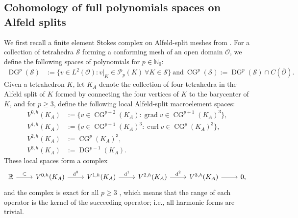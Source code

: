 \documentclass{mcom-l}
\theoremstyle{definition}
\theoremstyle{remark}
\numberwithin{equation}{section}
\DeclareMathOperator{\CG}{CG}
\DeclareMathOperator{\DG}{DG}
\DeclareMathOperator{\curl}{curl}
\DeclareMathOperator{\grad}{grad}
\DeclareMathOperator{\dee}{d}
\begin{document}
\subsection{Cohomology of full polynomials spaces on Alfeld splits}

We first recall a finite element Stokes complex on Alfeld-split meshes
from \cite{FuGuzmanNeilan20}.
For a collection of tetrahedra $\mathcal{S}$ forming a conforming mesh 
of an open domain $\mathcal{O}$, we define the following spaces of polynomials 
for $p \in \mathbb{N}_0$:
\begin{align*}
	\DG^p(\mathcal{S}) &:= \{ v \in L^2(\mathcal{O}) : 
	v|_{K} \in \mathcal{P}_p(K) \ \forall K \in \mathcal{S} \}
	\ \text{and} \   
	\CG^p(\mathcal{S}) := \DG^p(\mathcal{S}) \cap C(\bar{\mathcal{O}}).
\end{align*}
Given a tetrahedron $K$, let $K_A$ denote 
the collection of four tetrahedra in the Alfeld split of $K$ formed by 
connecting the four vertices of $K$ to the barycenter of $K$,
and for $p \geq 3$, define the following local Alfeld-split macroelement spaces:
\begin{subequations}
	\label{eq:local-full-alfeld}
	\begin{alignat}{2}
		V^{0, h}(K_A) &:= \{v \in \CG^{p+2}(K_A) 
		: \grad v \in \CG^{p+1}(K_A)^3\},\\
		V^{1, h}(K_A) &:= \{v \in \CG^{p+1}(K_A)^3 
		: \curl v \in \CG^{p}(K_A)^3\},\\
		V^{2, h}(K_A) &:= \CG^p(K_A)^3, \\
		V^{3, h}(K_A) &:= \DG^{p-1}(K_A).
	\end{alignat}	
\end{subequations}
These local spaces form a complex 
\begin{equation}
	\label{eq:stokes-complex-local-full-alfeld}
	\begin{tikzcd}
		\mathbb{R} \arrow[r, "\subset"] 
		& V^{0, h}(K_A) \arrow[r, "\dee^0"] 
		& V^{1, h}(K_A) \arrow[r, "\dee^1"] 
		& V^{2, h}(K_A) \arrow[r, "\dee^2"]
		& V^{3, h}(K_A) \arrow[r]
		& 0,
	\end{tikzcd}
\end{equation}
and the complex is exact for all 
$p \geq 3$ \cite[Theorem 4.7]{FuGuzmanNeilan20}, which means 
that the range of each operator is the kernel of the succeeding operator; 
i.e., all harmonic forms are trivial.
\end{document}
